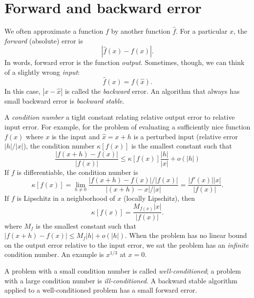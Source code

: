 \section{Forward and backward error}

We often approximate a function $f$ by another function $\hat{f}$.
For a particular $x$, the {\em forward} (absolute) error is
\[
  |\hat{f}(x)-f(x)|.
\]
In words, forward error is the function {\em output}.  Sometimes,
though, we can think of a slightly wrong {\em input}:
\[
  \hat{f}(x) = f(\hat{x}).
\]
In this case, $|x-\hat{x}|$ is called the {\em backward} error.
An algorithm that always has small backward error is {\em backward stable}.

A {\em condition number} a tight constant relating relative output
error to relative input error.  For example, for the problem of
evaluating a sufficiently nice function $f(x)$ where $x$ is the input
and $\hat{x} = x+h$ is a perturbed input (relative error $|h|/|x|$),
the condition number $\kappa[f(x)]$ is the smallest constant such that
\[
  \frac{|f(x+h)-f(x)|}{|f(x)|} \leq \kappa[f(x)] \frac{|h|}{|x|} + o(|h|)
\]
If $f$ is differentiable, the condition number is
\[
\kappa[f(x)] =
  \lim_{h \neq 0} \frac{|f(x+h)-f(x)|/|f(x)|}{|(x+h)-x|/|x|} =
  \frac{|f'(x)||x|}{|f(x)|}.
\]
If $f$ is Lipschitz in a neighborhood of $x$ (locally Lipschitz), then
\[
\kappa[f(x)] =
  \frac{M_{f(x)}|x|}{|f(x)|}.
\]
where $M_f$ is the smallest constant such that
$|f(x+h)-f(x)| \leq M_f |h| + o(|h|)$.  When the problem has no linear
bound on the output error relative to the input error, we sat the
problem has an {\em infinite} condition number.  An example is
$x^{1/3}$ at $x = 0$.

A problem with a small condition number is called {\em well-conditioned};
a problem with a large condition number is {\em ill-conditioned}.
A backward stable algorithm applied to a well-conditioned problem has
a small forward error.
